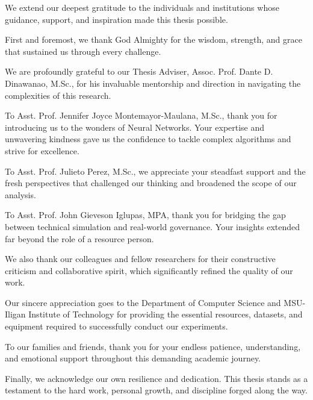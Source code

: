 \begin{acknowledgements}

 We extend our deepest gratitude to the individuals and institutions whose guidance, support, and inspiration made this thesis possible.

First and foremost, we thank God Almighty for the wisdom, strength, and grace that sustained us through every challenge.

We are profoundly grateful to our Thesis Adviser, Assoc. Prof. Dante D. Dinawanao, M.Sc., for his invaluable mentorship and direction in navigating the complexities of this research.

To Asst. Prof. Jennifer Joyce Montemayor-Maulana, M.Sc., thank you for introducing us to the wonders of Neural Networks. Your expertise and unwavering kindness gave us the confidence to tackle complex algorithms and strive for excellence.

To Asst. Prof. Julieto Perez, M.Sc., we appreciate your steadfast support and the fresh perspectives that challenged our thinking and broadened the scope of our analysis.

To Asst. Prof. John Gieveson Iglupas, MPA, thank you for bridging the gap between technical simulation and real-world governance. Your insights extended far beyond the role of a resource person.

We also thank our colleagues and fellow researchers for their constructive criticism and collaborative spirit, which significantly refined the quality of our work.

Our sincere appreciation goes to the Department of Computer Science and MSU-Iligan Institute of Technology for providing the essential resources, datasets, and equipment required to successfully conduct our experiments.

To our families and friends, thank you for your endless patience, understanding, and emotional support throughout this demanding academic journey.

Finally, we acknowledge our own resilience and dedication. This thesis stands as a testament to the hard work, personal growth, and discipline forged along the way.

\end{acknowledgements}